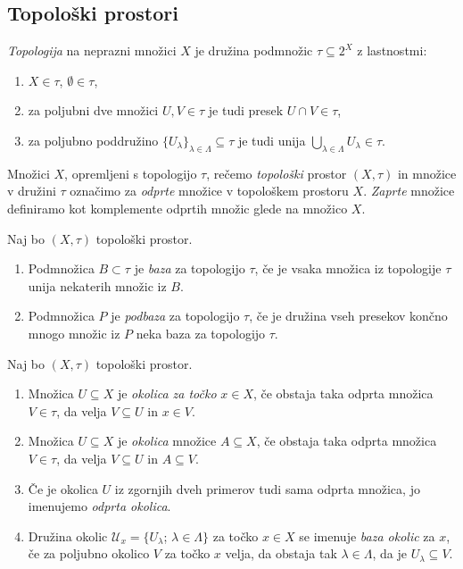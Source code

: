 \documentclass[mat1]{fmfdelo}
\newcommand{\Ucurl}{\mathcal{U}}
\begin{document}
\subsection{Topološki prostori}
\begin{definicija}\label{def:topologija}
\emph{Topologija} na neprazni množici $X$ je družina podmnožic $\tau \subseteq 2^X$ z lastnostmi:
\begin{enumerate}
\item $X \in \tau$, $\emptyset \in \tau$,
\item za poljubni dve množici $U,V \in \tau$ je tudi presek $U \cap V \in \tau$,
\item za poljubno poddružino $\lbrace U_{\lambda} \rbrace_{\lambda \in \Lambda} \subseteq \tau$ je tudi unija $\bigcup\limits_{\lambda \in \Lambda}^{} U_{\lambda} \in \tau$.
\end{enumerate}
Množici $X$, opremljeni s topologijo $\tau$, rečemo \emph{topološki} prostor $(X, \tau)$ in množice v družini $\tau$ označimo za \emph{odprte} množice v topološkem prostoru $X$. \emph{Zaprte} množice definiramo kot komplemente odprtih množic glede na množico $X$.
\end{definicija}

\begin{definicija}\label{def:baza}
Naj bo $(X, \tau)$ topološki prostor.
\begin{enumerate}
\item Podmnožica $B \subset \tau$ je \emph{baza} za topologijo $\tau$, če je vsaka množica iz topologije $\tau$ unija nekaterih množic iz $B$.
\item Podmnožica $P$ je \emph{podbaza} za topologijo $\tau$, če je družina vseh presekov končno mnogo množic iz $P$ neka baza za topologijo $\tau$.
\end{enumerate}
\end{definicija}

\begin{definicija}\label{def:okolica}
Naj bo $(X, \tau)$ topološki prostor.
\begin{enumerate}
\item Množica $U \subseteq X$ je \emph{okolica za točko} $x \in X$, če obstaja taka odprta množica $V \in \tau$, da velja $V \subseteq U$ in $x \in V$.
\item Množica $U \subseteq X$ je \emph{okolica} množice $A \subseteq X$, če obstaja taka odprta množica $V \in \tau$, da velja $V \subseteq U$ in $A \subseteq V$.
\item Če je okolica $U$ iz zgornjih dveh primerov tudi sama odprta množica, jo imenujemo \emph{odprta okolica}.
\item Družina okolic $\Ucurl_x = \lbrace U_\lambda$; $\lambda \in \Lambda \rbrace$ za točko $x \in X$ se imenuje \emph{baza okolic} za $x$, če za poljubno okolico $V$ za točko $x$ velja, da obstaja tak $\lambda \in \Lambda$, da je $U_\lambda \subseteq V$.
\end{enumerate}
\end{definicija}
\end{document}
